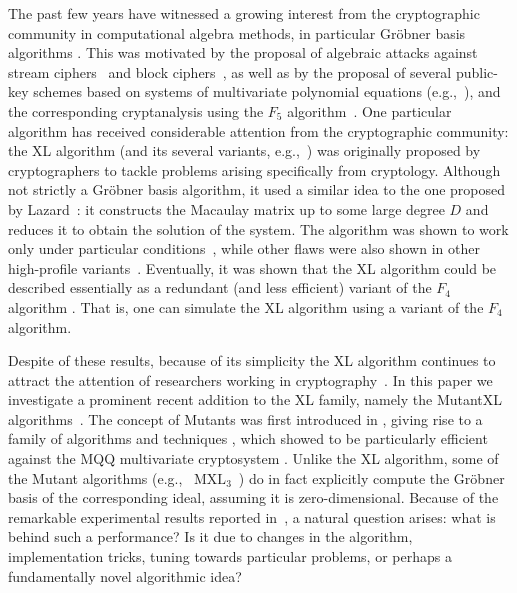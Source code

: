 The past few years have witnessed a growing interest from the cryptographic community in computational algebra methods, in particular Gr\"obner basis algorithms \cite{Buchberger65,DBLP:journals/jsc/Buchberger06a}.
This was motivated by the proposal of algebraic attacks against stream ciphers~\cite{courtois-meier-euro03} and block ciphers~\cite{courtois-pieprzyk:asiacrypt02,DBLP:conf/cisc/FaugereP09,DBLP:conf/fse/AlbrechtC09,ACTFP10}, as well as
by the proposal of several public-key schemes based on systems of multivariate polynomial equations (e.g.,~\cite{patarin-euro96}), and the corresponding cryptanalysis using the
$F_5$ algorithm~\cite{faugere-joux-crypto03,DBLP:conf/crypto/FaugereP06,DBLP:conf/crypto/FaugereLP08,DBLP:conf/pkc/BouillaguetFFP11}.  One particular algorithm has received considerable attention from the cryptographic community: the XL algorithm \cite{courtois-klimov-patarin-shamir:eurocrypt2000} 
(and its several variants, e.g.,~\cite{courtois-patarin:ct-rsa03,courtois-pieprzyk:asiacrypt02,Courtois2004}) was originally proposed by cryptographers to tackle problems arising specifically from cryptology. Although not strictly a Gr\"obner basis algorithm, it used a similar idea to the one proposed by Lazard~\cite{lazard-eurocal83}: it constructs the Macaulay matrix up to some large degree $D$ and reduces it to obtain the solution of the system. The algorithm was shown to work only under particular conditions~\cite{diem-asia04}, while other flaws were also shown in other high-profile variants~\cite{Cid2005a,DBLP:conf/fse/LimK07}.
Eventually, it was shown that the XL algorithm could be described essentially as a redundant (and less efficient) variant of the $F_4$ algorithm \cite{DBLP:conf/asiacrypt/ArsFIKS04}. That is, one can simulate the XL algorithm using a variant of the $F_4$ algorithm.

Despite of these results, because of its simplicity the XL algorithm continues to attract the attention of researchers working in cryptography~\cite{mxl,thomae-wolf:eprint2010}. In this paper we investigate a prominent recent addition to the XL family, namely the MutantXL algorithms~\cite{mxl,mxl2,mxl3,mxl4}. The concept of Mutants was first introduced in \cite{mxl}, giving rise to a family of algorithms and techniques \cite{mxl2,mxl3,mxl4}, which showed to be particularly efficient against the MQQ multivariate cryptosystem \cite{mohamed-werner-ding-buchmann:cans09}.  Unlike the XL algorithm, some of the Mutant algorithms (e.g.,~ $\textrm{MXL}_3$~\cite{mxl3}) do in fact explicitly compute the Gr\"obner basis of the corresponding ideal, assuming it is zero-dimensional.
Because of the remarkable experimental results reported in~\cite{mxl3}, a natural question arises: what is behind such a performance? Is it due to changes in the algorithm, implementation tricks, tuning towards particular problems, or perhaps a fundamentally novel algorithmic idea?

